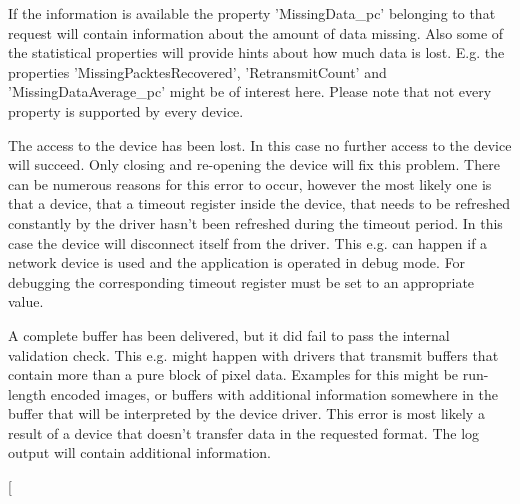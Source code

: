 \begin{Desc}
\begin{description}
If the information is available the property 'Missing\+Data\+\_\+pc' belonging to that request will contain information about the amount of data missing. Also some of the statistical properties will provide hints about how much data is lost. E.\+g. the properties 'Missing\+Packtes\+Recovered', 'Retransmit\+Count' and 'Missing\+Data\+Average\+\_\+pc' might be of interest here. Please note that not every property is supported by every device. \item[{\em 
\hypertarget{group___common_interface_ggab6148762ea638f8eabbabfc9468b0d4ca6bcce01e03b5a29d1b01c2f3cff7aeba}{rr\+Device\+Access\+Lost}\label{group___common_interface_ggab6148762ea638f8eabbabfc9468b0d4ca6bcce01e03b5a29d1b01c2f3cff7aeba}
}]The access to the device has been lost. In this case no further access to the device will succeed. Only closing and re-\/opening the device will fix this problem. There can be numerous reasons for this error to occur, however the most likely one is that a device, that a timeout register inside the device, that needs to be refreshed constantly by the driver hasn't been refreshed during the timeout period. In this case the device will disconnect itself from the driver. This e.\+g. can happen if a network device is used and the application is operated in debug mode. For debugging the corresponding timeout register must be set to an appropriate value. \item[{\em 
\hypertarget{group___common_interface_ggab6148762ea638f8eabbabfc9468b0d4caa98ce568e74c307bf247922fb01c4e07}{rr\+Inconsistent\+Buffer\+Content}\label{group___common_interface_ggab6148762ea638f8eabbabfc9468b0d4caa98ce568e74c307bf247922fb01c4e07}
}]A complete buffer has been delivered, but it did fail to pass the internal validation check. This e.\+g. might happen with drivers that transmit buffers that contain more than a pure block of pixel data. Examples for this might be run-\/length encoded images, or buffers with additional information somewhere in the buffer that will be interpreted by the device driver. This error is most likely a result of a device that doesn't transfer data in the requested format. The log output will contain additional information. \item[{\em 
}
\end{description}
\end{Desc}
